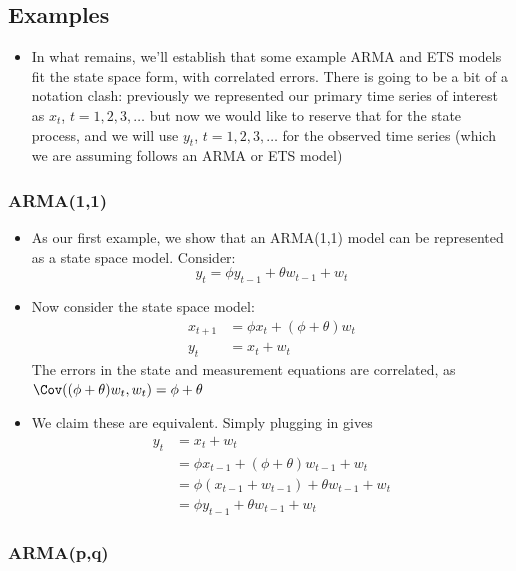 \documentclass{article}
\begin{document}
\subsection{Examples}

\begin{itemize}
\item In what remains, we'll establish that some example ARMA and ETS models fit
  the state space form, with correlated errors. There is going to be a bit of a 
  notation clash: previously we represented our primary time series of interest
  as $x_t$, $t = 1,2,3,\dots$ but now we would like to reserve that for the
  state process, and we will use $y_t$, $t = 1,2,3,\dots$ for the observed time 
  series (which we are assuming follows an ARMA or ETS model) 
\end{itemize}

\subsubsection{ARMA(1,1)}

\begin{itemize}
\item As our first example, we show that an ARMA(1,1) model can be represented
  as a state space model. Consider:
  \[
  y_t = \phi y_{t-1} + \theta w_{t-1} + w_t 
  \]

\item Now consider the state space model: 
  \begin{align*}
  x_{t+1} &= \phi x_t + (\phi + \theta) w_t \\
  y_t &= x_t + w_t
  \end{align*}  
  The errors in the state and measurement equations are correlated, as $\Cov(
  (\phi + \theta) w_t, w_t ) = \phi + \theta$    

\item We claim these are equivalent. Simply plugging in gives
  \begin{align*}
  y_t
  &= x_t + w_t \\
  &= \phi x_{t-1} + (\phi + \theta) w_{t-1} + w_t \\  
  &= \phi (x_{t-1} + w_{t-1}) + \theta w_{t-1} + w_t \\
  &= \phi y_{t-1} + \theta w_{t-1} + w_t 
  \end{align*}
\end{itemize}

\subsubsection{ARMA(p,q)}
\end{document}
